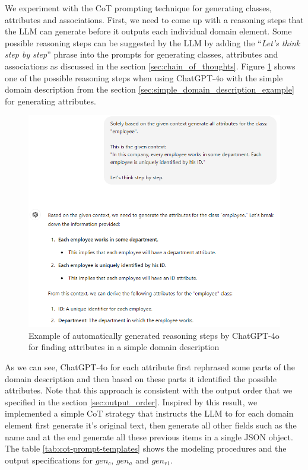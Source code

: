 We experiment with the CoT prompting technique for generating classes, attributes and associations. First, we need to come up with a reasoning steps that the LLM can generate before it outputs each individual domain element. Some possible reasoning steps can be suggested by the LLM by adding the ``\textit{Let's think step by step}'' phrase into the prompts for generating classes, attributes and associations as discussed in the section \ref{sec:chain_of_thoughts}. Figure \ref{fig:cot-think-step-by-step} shows one of the possible reasoning steps when using ChatGPT-4o with the simple domain description from the section \ref{sec:simple_domain_description_example} for generating attributes.

\begin{figure}[!h]
    \centering
    \includegraphics[scale=0.6]{img/cot-think-step-by-step.png}
    \caption{\centering Example of automatically generated reasoning steps by ChatGPT-4o for finding attributes in a simple domain description}
    \label{fig:cot-think-step-by-step}
\end{figure}

As we can see, ChatGPT-4o for each attribute first rephrased some parts of the domain description and then based on these parts it identified the possible attributes. Note that this approach is consistent with the output order that we specified in the section \ref{sec:output_order}.
Inspired by this result, we implemented a simple CoT strategy that instructs the LLM to for each domain element first generate it's original text, then generate all other fields such as the name and at the end generate all these previous items in a single JSON object. The table \ref{tab:cot-prompt-templates} shows the modeling procedures and the output specifications for $gen_c$, $gen_a$ and $gen_{r1}$.

